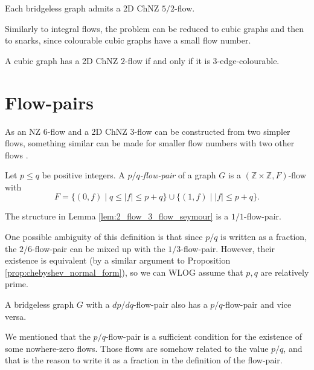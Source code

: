 \begin{conjecture} \emph{\cite[p. 22]{preprint}}
Each bridgeless graph admits a 2D ChNZ $5/2$-flow.\label{conj:chebyshev_upper_seymour}
\end{conjecture}

Similarly to integral flows, the problem can be reduced to cubic graphs and then to snarks, since colourable cubic graphs have a small flow number.

\begin{theorem} \emph{\cite[p. 14]{preprint}}
A cubic graph has a 2D ChNZ $2$-flow if and only if it is $3$-edge-colourable.\label{th:2_chnzf_iff_3_col}
\end{theorem}

\section{Flow-pairs}

As an NZ $6$-flow and a 2D ChNZ $3$-flow can be constructed from two simpler flows, something similar can be made for smaller flow numbers with two other flows \cite[p. 19]{preprint}.

\begin{definition}
Let $p\leq q$ be positive integers. A \emph{$p/q$-flow-pair} of a graph $G$ is a $(\mathbb Z\times\mathbb Z, F)$-flow with
\begin{equation*}
F = \{(0, f)\mid q\leq|f|\leq p+q\}\cup\{(1,f)\mid |f|\leq p+q\}.
\end{equation*}
\end{definition}

\begin{remark}
The structure in Lemma \ref{lem:2_flow_3_flow_seymour} is a $1/1$-flow-pair.
\end{remark}

One possible ambiguity of this definition is that since $p/q$ is written as a fraction, the $2/6$-flow-pair can be mixed up with the $1/3$-flow-pair. However, their existence is equivalent (by a similar argument to Proposition \ref{prop:chebyshev_normal_form}), so we can WLOG assume that $p,q$ are relatively prime.

\begin{lemma} \emph{\cite[p. 19]{preprint}}
A bridgeless graph $G$ with a $dp/dq$-flow-pair also has a $p/q$-flow-pair and vice versa.
\end{lemma}

We mentioned that the $p/q$-flow-pair is a sufficient condition for the existence of some nowhere-zero flows. Those flows are somehow related to the value $p/q$, and that is the reason to write it as a fraction in the definition of the flow-pair.

